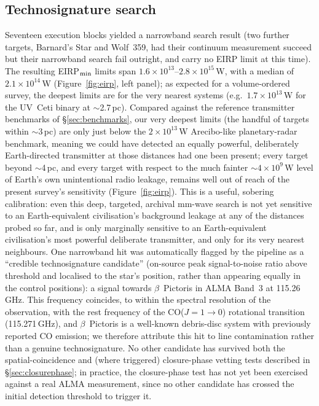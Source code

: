 \documentclass{openjournal}
\begin{document}
\subsection{Technosignature search}

Seventeen execution blocks yielded a narrowband search result (two
further targets, Barnard's Star and Wolf~359, had their continuum
measurement succeed but their narrowband search fail outright, and carry
no EIRP limit at this time). The resulting EIRP$_{\rm min}$ limits span
$1.6\times10^{13}$--$2.8\times10^{15}$\,W, with a median of
$2.1\times10^{14}$\,W (Figure~\ref{fig:eirp}, left panel); as expected
for a volume-ordered survey, the deepest limits are for the very nearest
systems (e.g.\ $1.7\times10^{13}$\,W for the UV~Ceti binary at $\sim$2.7\,pc).
Compared against the reference transmitter benchmarks of
\S\ref{sec:benchmarks}, our very deepest limits (the handful of targets
within $\sim$3\,pc) are only just below the $2\times10^{13}$\,W
Arecibo-like planetary-radar benchmark, meaning we could have detected an
equally powerful, deliberately Earth-directed transmitter at those
distances had one been present; every target beyond $\sim$4\,pc, and
every target with respect to the much fainter $\sim4\times10^{9}$\,W
level of Earth's own unintentional radio leakage, remains well out of
reach of the present survey's sensitivity (Figure~\ref{fig:eirp}). This
is a useful, sobering calibration: even this deep, targeted, archival
mm-wave search is not yet sensitive to an Earth-equivalent civilisation's
background leakage at any of the distances probed so far, and is only
marginally sensitive to an Earth-equivalent civilisation's most powerful
deliberate transmitter, and only for its very nearest neighbours.
One narrowband hit was automatically flagged by the pipeline as a
``credible technosignature candidate'' (on-source peak signal-to-noise
ratio above threshold and localised to the star's position, rather than
appearing equally in the control positions): a signal towards $\beta$~Pictoris
in ALMA Band~3 at 115.26\,GHz. This frequency coincides, to within the
spectral resolution of the observation, with the rest frequency of the
CO($J=1\to0$) rotational transition (115.271\,GHz), and $\beta$~Pictoris
is a well-known debris-disc system with previously reported CO emission;
we therefore attribute this hit to line contamination rather than a
genuine technosignature. No other candidate has survived both the
spatial-coincidence and (where triggered) closure-phase vetting tests
described in \S\ref{sec:closurephase}; in practice, the closure-phase test
has not yet been exercised against a real ALMA measurement, since no
other candidate has crossed the initial detection threshold to trigger it.
\end{document}
